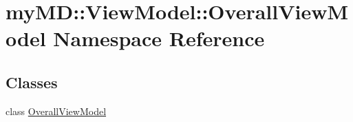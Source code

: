 \hypertarget{namespacemy_m_d_1_1_view_model_1_1_overall_view_model}{
\section{my\-MD::View\-Model::Overall\-View\-Model Namespace Reference}
\label{d8/d63/namespacemy_m_d_1_1_view_model_1_1_overall_view_model}
}


\subsection*{Classes}
\begin{CompactItemize}
\item 
class \hyperlink{classmy_m_d_1_1_view_model_1_1_overall_view_model_1_1_overall_view_model}{Overall\-View\-Model}
\end{CompactItemize}
